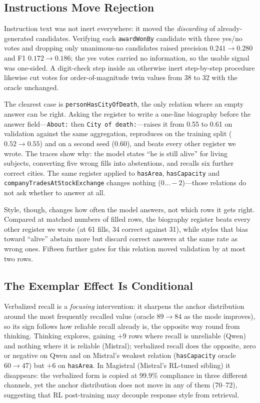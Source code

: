 \documentclass[11pt]{article}
\begin{document}
\subsection{Instructions Move Rejection}
\label{sec:rejection}

Instruction text was not inert everywhere: it moved the
\emph{discarding} of already-generated candidates. Verifying each
\texttt{awardWonBy} candidate with three yes/no votes and dropping only
unanimous-no candidates raised precision $0.241\rightarrow0.280$ and F1
$0.172\rightarrow0.186$; the yes votes carried no information, so the
usable signal was one-sided. A digit-check step inside an otherwise inert
step-by-step procedure likewise cut votes for order-of-magnitude twin
values from 38 to 32 with the oracle unchanged.

The clearest case is \texttt{personHasCityOfDeath}, the only relation
where an empty answer can be right. Asking the register to write a
one-line biography before the answer field---\texttt{About:} then
\texttt{City of death:}---raises it from 0.55 to 0.61 on validation
against the same aggregation, reproduces on the training split
($0.52\rightarrow0.55$) and on a second seed (0.60), and beats every
other register we wrote. The traces show why: the model states ``he is
still alive'' for living subjects, converting five wrong fills into
abstentions, and recalls six further correct cities. The same register
applied to \texttt{hasArea}, \texttt{hasCapacity} and
\texttt{companyTradesAtStockExchange} changes nothing
($0\ldots-2$)---those relations do not ask whether to answer at all.

Style, though, changes how often the model answers, not which rows
it gets right. Compared at matched numbers of filled rows, the biography
register beats every other register we wrote (at 61 fills, 34 correct
against 31), while styles that bias toward ``alive'' abstain more but
discard correct answers at the same rate as wrong ones. Fifteen further
gates for this relation moved validation by at most two rows.

\subsection{The Exemplar Effect Is Conditional}
\label{sec:conditions}

Verbalized recall is a \emph{focusing} intervention: it sharpens the
anchor distribution around the most frequently recalled value (oracle
$89\rightarrow84$ as the mode improves), so its sign follows how reliable
recall already is, the opposite way round from thinking. Thinking explores,
gaining $+9$ rows where recall is unreliable (Qwen) and nothing where it
is reliable (Mistral); verbalized recall does the opposite, zero or
negative on Qwen and on Mistral's weakest relation (\texttt{hasCapacity}
oracle $60\rightarrow47$) but $+6$ on \texttt{hasArea}. In Magistral
(Mistral's RL-tuned sibling) it disappears: the verbalized form is copied
at 99.9\% compliance in three different channels, yet the anchor
distribution does not move in any of them (70--72), suggesting that RL
post-training may decouple response style from retrieval.
\end{document}
